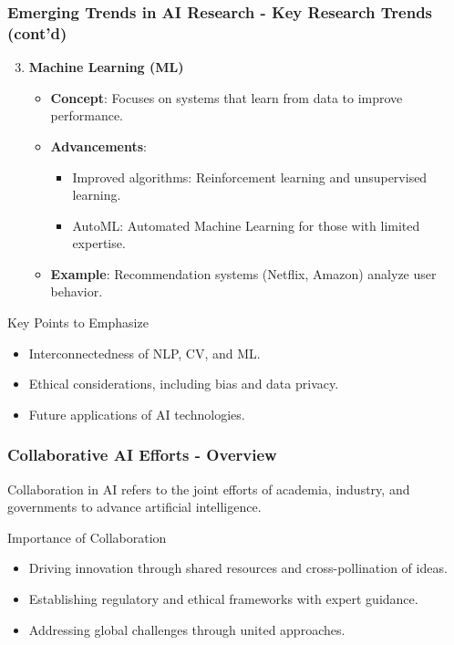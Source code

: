 \documentclass{beamer}
\begin{document}
\begin{frame}[fragile]
    \frametitle{Emerging Trends in AI Research - Key Research Trends (cont'd)}
    \begin{enumerate}
        \setcounter{enumi}{2} %
        \item \textbf{Machine Learning (ML)}
            \begin{itemize}
                \item \textbf{Concept}: Focuses on systems that learn from data to improve performance.
                \item \textbf{Advancements}:
                    \begin{itemize}
                        \item Improved algorithms: Reinforcement learning and unsupervised learning.
                        \item AutoML: Automated Machine Learning for those with limited expertise.
                    \end{itemize}
                \item \textbf{Example}: Recommendation systems (Netflix, Amazon) analyze user behavior.
            \end{itemize}
    \end{enumerate}
    \begin{block}{Key Points to Emphasize}
        \begin{itemize}
            \item Interconnectedness of NLP, CV, and ML.
            \item Ethical considerations, including bias and data privacy.
            \item Future applications of AI technologies.
        \end{itemize}
    \end{block}
\end{frame}

\begin{frame}[fragile]
    \frametitle{Collaborative AI Efforts - Overview}
    Collaboration in AI refers to the joint efforts of academia, industry, and governments to advance artificial intelligence.
    
    \begin{block}{Importance of Collaboration}
        \begin{itemize}
            \item Driving innovation through shared resources and cross-pollination of ideas.
            \item Establishing regulatory and ethical frameworks with expert guidance.
            \item Addressing global challenges through united approaches.
        \end{itemize}
    \end{block}
\end{frame}
\end{document}
